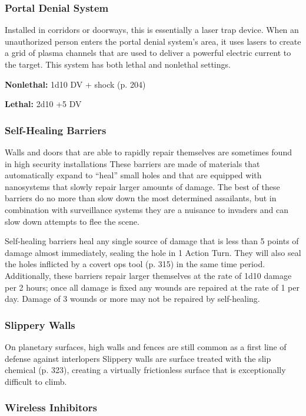 \subsubsection{Portal Denial System}

Installed in corridors or doorways, this is essentially 
a laser trap device. When an unauthorized person 
enters the portal denial system's area, it uses lasers 
to create a grid of plasma channels that are used to 
deliver a powerful electric current to the target. This 
system has both lethal and nonlethal settings.

\textbf{Nonlethal:} 1d10 DV + shock (p. 204)

\textbf{Lethal:} 2d10 +5 DV

\subsubsection{Self-Healing Barriers}

Walls and doors that are able to rapidly repair themselves
are sometimes found in high security installations
These barriers are made of materials that
automatically expand to ``heal'' small holes and that 
are equipped with nanosystems that slowly repair 
larger amounts of damage. The best of these barriers 
do no more than slow down the most determined 
assailants, but in combination with surveillance systems
they are a nuisance to invaders and can slow
down attempts to flee the scene.

Self-healing barriers heal any single source of 
damage that is less than 5 points of damage almost 
immediately, sealing the hole in 1 Action Turn. They 
will also seal the holes inflicted by a covert ops 
tool (p. 315) in the same time period. Additionally, 
these barriers repair larger themselves at the rate of 
1d10 damage per 2 hours; once all damage is fixed 
any wounds are repaired at the rate of 1 per day. 
Damage of 3 wounds or more may not be repaired 
by self-healing.

\subsubsection{Slippery Walls}

On planetary surfaces, high walls and fences are still 
common as a first line of defense against interlopers
Slippery walls are surface treated with the slip
chemical (p. 323), creating a virtually frictionless 
surface that is exceptionally difficult to climb.

\subsubsection{Wireless Inhibitors}

